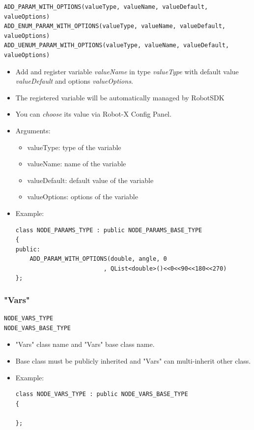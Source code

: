 \documentclass[a4paper,10pt]{book}
\begin{document}
\begin{mdframed}
\begin{verbatim}
ADD_PARAM_WITH_OPTIONS(valueType, valueName, valueDefault, valueOptions)
ADD_ENUM_PARAM_WITH_OPTIONS(valueType, valueName, valueDefault, valueOptions)
ADD_UENUM_PARAM_WITH_OPTIONS(valueType, valueName, valueDefault, valueOptions)
\end{verbatim}
\begin{itemize}
 \item Add and register variable {\em{valueName}} in type {\em{valueType}} with default value {\em{valueDefault}} and options {\em{valueOptions}}.
 \item The registered variable will be automatically managed by RobotSDK
 \item You can {\em{choose}} its value via Robot-X Config Panel.
 \item Arguments:
 \begin{itemize}
  \item valueType: type of the variable
  \item valueName: name of the variable
  \item valueDefault: default value of the variable
  \item valueOptions: options of the variable
 \end{itemize}
 \item Example:
 \begin{verbatim}
class NODE_PARAMS_TYPE : public NODE_PARAMS_BASE_TYPE
{
public:
    ADD_PARAM_WITH_OPTIONS(double, angle, 0
                         , QList<double>()<<0<<90<<180<<270)
};
 \end{verbatim}
\end{itemize}
\end{mdframed}

\subsubsection{"Vars"}

\begin{mdframed}
\begin{verbatim}
NODE_VARS_TYPE
NODE_VARS_BASE_TYPE
\end{verbatim}
\begin{itemize}
 \item "Vars" class name and "Vars" base class name.
 \item Base class must be publicly inherited and "Vars" can multi-inherit other class. 
\end{itemize}
\begin{itemize}
 \item Example:
 \begin{verbatim}
class NODE_VARS_TYPE : public NODE_VARS_BASE_TYPE
{

};
 \end{verbatim}
\end{itemize}
\end{mdframed}
\end{document}

